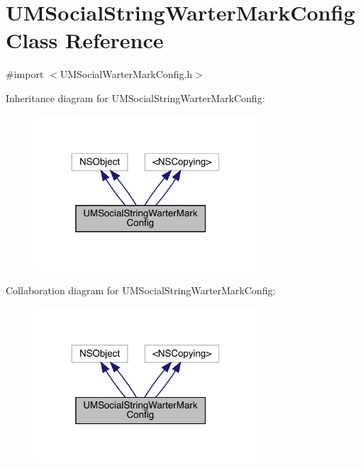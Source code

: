 \hypertarget{interface_u_m_social_string_warter_mark_config}{}\section{U\+M\+Social\+String\+Warter\+Mark\+Config Class Reference}
\label{interface_u_m_social_string_warter_mark_config}


{\ttfamily \#import $<$U\+M\+Social\+Warter\+Mark\+Config.\+h$>$}



Inheritance diagram for U\+M\+Social\+String\+Warter\+Mark\+Config\+:\nopagebreak
\begin{figure}[H]
\begin{center}
\leavevmode
\includegraphics[width=236pt]{interface_u_m_social_string_warter_mark_config__inherit__graph}
\end{center}
\end{figure}


Collaboration diagram for U\+M\+Social\+String\+Warter\+Mark\+Config\+:\nopagebreak
\begin{figure}[H]
\begin{center}
\leavevmode
\includegraphics[width=236pt]{interface_u_m_social_string_warter_mark_config__coll__graph}
\end{center}
\end{figure}
